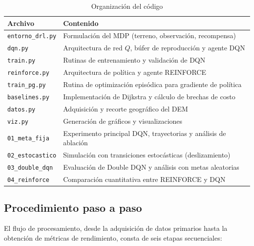 \begin{table}[t]
\caption{Organización del código}
\label{tab:codigo}
\centering
\footnotesize
\begin{tabular}{lp{4.7cm}}
\toprule
Archivo & Contenido \\
\midrule
\texttt{entorno\_drl.py} & Formulación del MDP (terreno, observación, recompensa) \\
\texttt{dqn.py}          & Arquitectura de red $Q$, búfer de reproducción y agente DQN \\
\texttt{train.py}        & Rutinas de entrenamiento y validación de DQN \\
\texttt{reinforce.py}    & Arquitectura de política y agente REINFORCE \\
\texttt{train\_pg.py}    & Rutina de optimización episódica para gradiente de política \\
\texttt{baselines.py}    & Implementación de Dijkstra y cálculo de brechas de costo \\
\texttt{datos.py}        & Adquisición y recorte geográfico del DEM \\
\texttt{viz.py}          & Generación de gráficos y visualizaciones \\
\midrule
\texttt{01\_meta\_fija}    & Experimento principal DQN, trayectorias y análisis de ablación \\
\texttt{02\_estocastico}   & Simulación con transiciones estocásticas (deslizamiento) \\
\texttt{03\_double\_dqn}   & Evaluación de Double DQN y análisis con metas aleatorias \\
\texttt{04\_reinforce}     & Comparación cuantitativa entre REINFORCE y DQN \\
\bottomrule
\end{tabular}
\end{table}

\subsection{Procedimiento paso a paso}
El flujo de procesamiento, desde la adquisición de datos primarios hasta la obtención de métricas de rendimiento, consta de seis etapas secuenciales:

